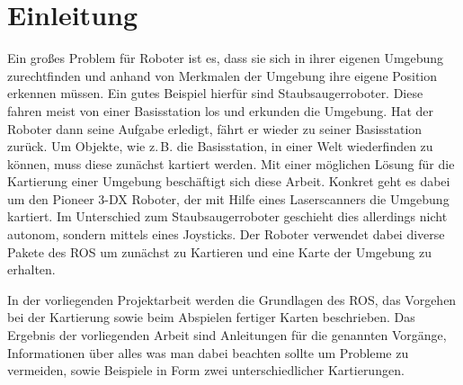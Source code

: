 \chapter{Einleitung} %
\label{cha:einleitung}

Ein großes Problem für Roboter ist es, dass sie sich in ihrer eigenen Umgebung zurechtfinden und anhand von Merkmalen der Umgebung ihre eigene Position erkennen müssen. Ein gutes Beispiel hierfür sind Staubsaugerroboter. Diese fahren meist von einer Basisstation los und erkunden die Umgebung. Hat der Roboter dann seine Aufgabe erledigt, fährt er wieder zu seiner Basisstation zurück. Um Objekte, wie z.\,B. die Basisstation, in einer Welt wiederfinden zu können, muss diese zunächst kartiert werden. Mit einer möglichen Lösung für die Kartierung einer Umgebung beschäftigt sich diese Arbeit. Konkret geht es dabei um den Pioneer 3-DX Roboter, der mit Hilfe eines Laserscanners die Umgebung kartiert. Im Unterschied zum Staubsaugerroboter geschieht dies allerdings nicht autonom, sondern mittels eines Joysticks. Der Roboter verwendet dabei diverse Pakete des \ac{ROS} um zunächst zu Kartieren und eine Karte der Umgebung zu erhalten.\par
In der vorliegenden Projektarbeit werden die Grundlagen des \ac{ROS}, das Vorgehen bei der Kartierung sowie beim Abspielen fertiger Karten beschrieben. Das Ergebnis der vorliegenden Arbeit sind Anleitungen für die ge\-nann\-ten Vorgänge, Informationen über alles was man dabei beachten sollte um Probleme zu vermeiden, sowie Beispiele in Form zwei unterschiedlicher Kartierungen.

